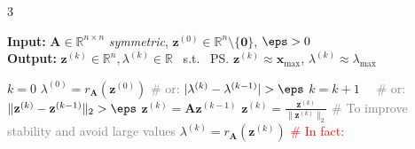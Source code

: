 \documentclass{note}
\begin{document}
\begin{multicols}{3}

\begin{algorithm}[H]
\tiny
\caption*{\textbf{PI} Power Iteration \quad \ps{$C=k_{\max}(4n^2+5n+1)$} }
\textbf{Input:} $\mathbf{A} \in \mathbb{R}^{n \times n}$ \textit{symmetric}, $\mathbf{z}^{(0)} \in \mathbb{R}^n\setminus\{\mathbf{0}\}$, $\eps>0$ \\
\textbf{Output:} $\mathbf{z}^{(k)} \in \mathbb{R}^n, \lambda^{(k)} \in \mathbb{R}$ \ s.t. \ \ps{$\mathbf{z}^{(k)} \approx \mathbf{x}_{\max}$, $\lambda^{(k)} \approx \lambda_{\max}$}
\begin{algorithmic}[1]
  \State $k = 0$
  \State $\lambda^{(0)} = r_{\mathbf{A}}(\mathbf{z}^{(0)})$
   \quad \textcolor{gray}{\tiny \# or: $|\lambda^{(k)} - \lambda^{(k-1)}| > \eps$}
    \State $k = k + 1$ \qquad\qquad\qquad\qquad\qquad \ \ \textcolor{gray}{\tiny \# or: $\|\mathbf{z}^{(k)} - \mathbf{z}^{(k-1)}\|_2 > \eps$}
    \State $\mathbf{z}^{(k)} = \mathbf{A} \mathbf{z}^{(k-1)}$
    \State $\mathbf{z}^{(k)} = \frac{\mathbf{z}^{(k)}}{\|\mathbf{z}^{(k)}\|_2}$ \quad \textcolor{gray}{\tiny \# To improve stability and avoid large values}
    \vspace{-1pt}
    \State $\lambda^{(k)} = r_{\mathbf{A}}(\mathbf{z}^{(k)})$ \qquad \textcolor{red}{\tiny \# In fact: }
    \vspace{-5pt}
  \EndWhile
\end{algorithmic}
\end{algorithm}



\end{multicols}
\end{document}
